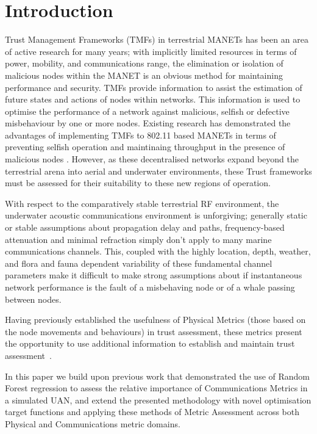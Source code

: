 \documentclass[conference]{IEEEtran}
\begin{document}
\section{Introduction}

Trust Management Frameworks (TMFs) in terrestrial MANETs has been an area of active research for many years; with implicitly limited resources in terms of power, mobility, and communications range, the elimination or isolation of malicious nodes within the MANET is an obvious method for maintaining performance and security. 
TMFs provide information to assist the estimation of future states and actions of nodes within networks. 
This information is used to optimise the performance of a network against malicious, selfish or defective misbehaviour by one or more nodes. 
Existing research has demonstrated the advantages of implementing TMFs to 802.11 based MANETs in terms of preventing selfish operation and maintinaing throughput in the presence of malicious nodes \cite{Li2007,Buchegger2002}.
However, as these decentralised networks expand beyond the terrestrial arena into aerial and underwater environments, these Trust frameworks must be assessed for their suitability to these new regions of operation.

With respect to the comparatively stable terrestrial RF environment, the underwater acoustic communications environment is unforgiving; generally static or stable assumptions about propagation delay and paths, frequency-based attenuation and minimal refraction simply don't apply to many marine communications channels.
This, coupled with the highly location, depth, weather, and flora and fauna dependent variability of these fundamental channel parameters make it difficult to make strong assumptions about if instantaneous network performance is the fault of a misbehaving node or of a whale passing between nodes.

Having previously established the usefulness of Physical Metrics (those based on the node movements and behaviours) in trust assessment, these metrics present the opportunity to use additional information to establish and maintain trust assessment~\cite{Bolster2016}.

In this paper we build upon previous work \cite{Bolster2015} that demonstrated the use of  Random Forest regression \cite{Breiman2001} to assess the relative importance of Communications Metrics in a simulated UAN, and extend the presented methodology with novel optimisation target functions and applying these methods of Metric Assessment across both Physical and Communications metric domains.
\end{document}
